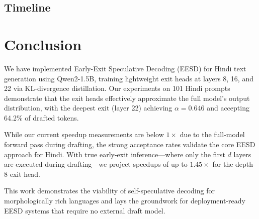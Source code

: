 \documentclass[11pt]{article}
\begin{document}
\subsection{Timeline}


\begin{table}[h]
\centering
\small
{}
\caption{Project timeline.  Weeks 1--8 are completed; weeks 9--14 are planned.}
\label{tab:timeline}
\end{table}


\section{Conclusion}
\label{sec:conclusion}

We have implemented Early-Exit Speculative Decoding (EESD) for Hindi text generation using Qwen2-1.5B, training lightweight exit heads at layers 8, 16, and 22 via KL-divergence distillation.  Our experiments on 101 Hindi prompts demonstrate that the exit heads effectively approximate the full model's output distribution, with the deepest exit (layer 22) achieving $\alpha = 0.646$ and accepting 64.2\% of drafted tokens.

While our current speedup measurements are below $1\times$ due to the full-model forward pass during drafting, the strong acceptance rates validate the core EESD approach for Hindi.  With true early-exit inference—where only the first $d$ layers are executed during drafting—we project speedups of up to $1.45\times$ for the depth-8 exit head.

This work demonstrates the viability of self-speculative decoding for morphologically rich languages and lays the groundwork for deployment-ready EESD systems that require no external draft model.
\end{document}

